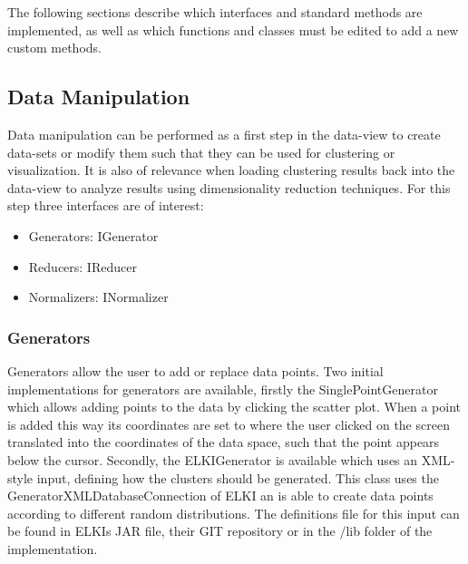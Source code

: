 \documentclass[
	a4paper,
	english,
	twoside,
	openright,               
	11pt                            
	]{report}
\begin{document}
The following sections describe which interfaces and standard methods are implemented, as well as which functions and classes must be edited to add a new custom methods.

\subsection{Data Manipulation}

Data manipulation can be performed as a first step in the data-view to create data-sets or modify them such that they can be used for clustering or visualization. It is also of relevance when loading clustering results back into the data-view to analyze results using dimensionality reduction techniques. For this step three interfaces are of interest:

\begin{itemize}
  \item Generators: IGenerator
  \item Reducers: IReducer
  \item Normalizers: INormalizer
\end{itemize}

\subsubsection{Generators}
Generators allow the user to add or replace data points. Two initial implementations for generators are available, firstly the SinglePointGenerator which allows adding points to the data by clicking the scatter plot. When a point is added this way its coordinates are set to where the user clicked on the screen translated into the coordinates of the data space, such that the point appears below the cursor. Secondly, the ELKIGenerator is available which uses an XML-style input, defining how the clusters should be generated. This class uses the GeneratorXMLDatabaseConnection of ELKI \cite{10.1007/978-3-540-69497-7_41} an is able to create data points according to different random distributions. The definitions file for this input can be found in ELKIs JAR file, their GIT repository \cite{elkixml} or in the /lib folder of the implementation.

\end{document}
